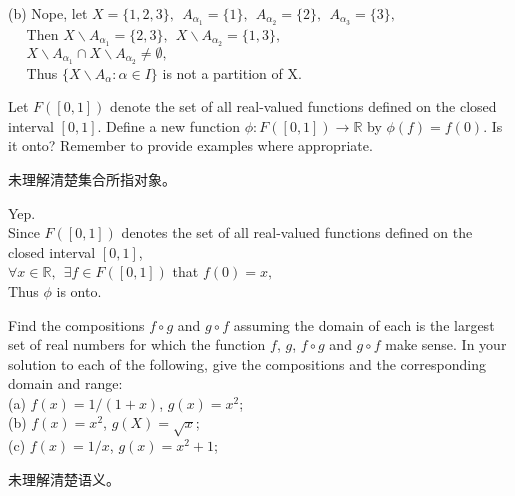 \documentclass[11pt, a4paper, UTF8]{ctexart}
\begin{document}
\begin{revision}
    (b) Nope, let $X = \{1,2,3\},~~A_{\alpha_{1}} = \{1\},~~A_{\alpha_{2}} = \{2\},~~
    A_{\alpha_{3}} = \{3\},$\\
    $~~~~~~$Then $X\backslash A_{\alpha_{1}} = \{2,3\},~~X\backslash A_{\alpha_{2}} = \{1,3\},$\\
    $~~~~~~X\backslash A_{\alpha_{1}}\cap X\backslash A_{\alpha_{2}} \neq \emptyset,$\\
    $~~~~~~$Thus $\{X \backslash A_{\alpha}: \alpha \in I\}$ is not a partition of X.
\end{revision}
\begin{problem}[UD: 14.13]
    Let $F([0,1])$ denote the set of all real-valued functions defined on the closed 
  interval $[0,1]$. Define a new function $\phi:F([0,1]) \rightarrow \mathbb{R}$ by 
  $\phi(f) = f(0)$. Is it onto? Remember to provide examples where appropriate.
\end{problem}

\begin{cause}
    未理解清楚集合所指对象。
\end{cause}

\begin{revision}
    Yep.\\
    Since $F([0,1])$ denotes the set of all real-valued functions defined on the closed 
    interval $[0,1]$,\\
    $\forall x \in \mathbb{R},~~\exists f \in F([0,1])$ that $f(0) = x,$\\
    Thus $\phi$ is onto.
\end{revision}
\begin{problem}[UD: 15.1]
    Find the compositions $f \circ g$ and $g \circ f$ assuming the domain of each is 
  the largest set of real numbers for which the function $f$, $g$, $f \circ g$ and 
  $g \circ f$ make sense. In your solution to each of the following, give the compositions 
  and the corresponding domain and range:\\
  (a) $f(x) = 1/(1 + x)$, $g(x) = x^{2}$;\\
  (b) $f(x) = x^{2}$, $g(X) = \sqrt{x}$;\\
  (c) $f(x) = 1/x$, $g(x) = x^{2} + 1$;
\end{problem}

\begin{cause}
    未理解清楚语义。
\end{cause}
\end{document}
